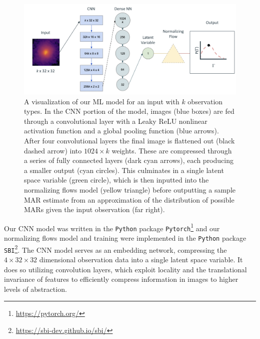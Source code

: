 \documentclass[twocolumn, linenumbers, 11pt]{aastex63}%
\begin{document}
\begin{figure}
    \centering
    \includegraphics[width=\textwidth]{model_diagram_2.png}
    \caption{
    A visualization of our ML model for an input with $k$ observation types. In the CNN portion of the model, images (blue boxes) are fed through a convolutional layer with a Leaky ReLU nonlinear activation function and a global pooling function (blue arrows). After four convolutional layers the final image is flattened out (black dashed arrow) into $1024 \times k$ weights. These are compressed through a series of fully connected layers (dark cyan arrows), each producing a smaller output (cyan circles). This culminates in a single latent space variable (green circle), which is then inputted into the normalizing flows model (yellow triangle) before outputting a sample MAR estimate from an approximation of the distribution of possible MARs given the input observation (far right).}
    \label{fig:model_diagram}
\end{figure}

Our CNN model was written in the \texttt{Python} package \texttt{Pytorch}\footnote{\url{https://pytorch.org/}} and our normalizing flows model and training were implemented in the \texttt{Python} package \texttt{SBI}\footnote{\url{https://sbi-dev.github.io/sbi/}}. The CNN model serves as an embedding network, compressing the $4\times32\times32$ dimensional observation data into a single latent space variable. It does so utilizing convolution layers, which exploit locality and the translational invariance of features to efficiently compress information in images to higher levels of abstraction. 
\end{document}
